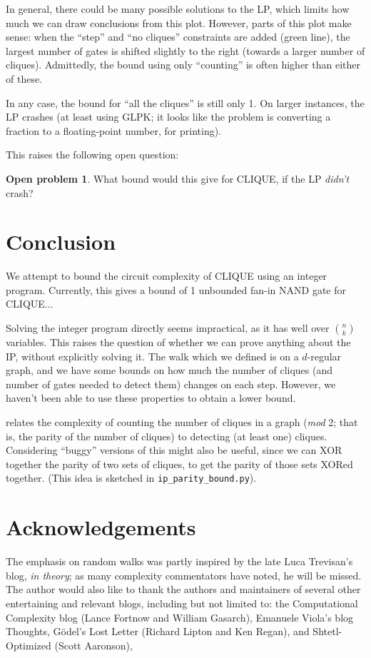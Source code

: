\documentclass[12pt]{article}
\theoremstyle{definition}
\newtheorem{prob}{Open problem}[section]
\begin{document}
In general, there could be many possible solutions to the LP, which
limits how much we can draw conclusions from this plot.  However,
parts of this plot make sense: when the ``step'' and ``no cliques''
constraints are added (green line), the largest number of gates is
shifted slightly to the right (towards a larger number of cliques).
Admittedly, the bound using only ``counting'' is often higher than
either of these.

In any case, the bound for ``all the cliques'' is still only 1.  On
larger instances, the LP crashes (at least using GLPK; it looks
like the problem is converting a fraction to a floating-point number,
for printing).

This raises the following open question:

\begin{prob}
What bound would this give for CLIQUE, if the LP {\em didn't} crash?
\end{prob}


\section{Conclusion}

We attempt to bound the circuit complexity of CLIQUE using an integer program.
Currently, this gives a bound
of 1 unbounded fan-in NAND gate for CLIQUE...

Solving the integer program directly seems impractical, as it has well over
${n \choose k}$ variables. This raises the question of whether we can prove
anything about the IP, without explicitly solving it.
The walk which we defined is on a $d$-regular graph, and we have some bounds on
how much the number of cliques (and number of gates needed to detect them)
changes on each step. However, we haven't been able to use these properties
to obtain a lower bound.

\cite{goldreich2025counting} relates the complexity of
counting the number of cliques in a graph ({\em mod} 2; that is, the parity
of the number of cliques) to
detecting (at least one) cliques. Considering ``buggy'' versions of this
might also be useful, since we can XOR together the parity of two sets of
cliques, to get the parity of those sets XORed together. (This idea is sketched
in {\tt ip\_parity\_bound.py}).

\section{Acknowledgements}

The emphasis on random walks was partly inspired by the late Luca
Trevisan's blog, {\em in theory}; as many complexity commentators
have noted, he will be missed. The author would also like to thank
the authors and maintainers of several other entertaining and
relevant blogs, including but not limited to: the Computational
Complexity blog (Lance Fortnow and William Gasarch), Emanuele Viola's
blog Thoughts, G\"odel's Lost Letter (Richard Lipton and Ken Regan),
and Shtetl-Optimized (Scott Aaronson),



\end{document}

